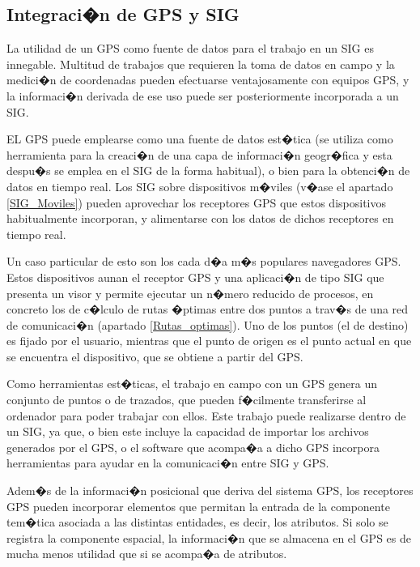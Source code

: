 \subsection{Integraci�n de GPS y SIG}


La utilidad de un GPS como fuente de datos para el trabajo en un SIG es innegable. Multitud de trabajos que requieren la toma de datos en campo y la medici�n de coordenadas pueden efectuarse ventajosamente con equipos GPS, y la informaci�n derivada de ese uso puede ser posteriormente incorporada a un SIG.

EL GPS puede emplearse como una fuente de datos est�tica (se utiliza como herramienta para la creaci�n de una capa de informaci�n geogr�fica y esta despu�s se emplea en el SIG de la forma habitual), o bien para la obtenci�n de datos en tiempo real. Los SIG sobre dispositivos m�viles (v�ase el apartado \ref{SIG_Moviles}) pueden aprovechar los receptores GPS que estos dispositivos habitualmente incorporan, y alimentarse con los datos de dichos receptores en tiempo real.

Un caso particular de esto son los cada d�a m�s populares navegadores GPS. Estos dispositivos aunan el receptor GPS y una aplicaci�n de tipo SIG que presenta un visor y permite ejecutar un n�mero reducido de procesos, en concreto los de c�lculo de rutas �ptimas entre dos puntos a trav�s de una red de comunicaci�n (apartado \ref{Rutas_optimas}). Uno de los puntos (el de destino) es fijado por el usuario, mientras que el punto de origen es el punto actual en que se encuentra el dispositivo, que se obtiene a partir del GPS.

Como herramientas est�ticas, el trabajo en campo con un GPS genera un conjunto de puntos o de trazados, que pueden f�cilmente transferirse al ordenador para poder trabajar con ellos. Este trabajo puede realizarse dentro de un SIG, ya que, o bien este incluye la capacidad de importar los archivos generados por el GPS, o el software que acompa�a a dicho GPS incorpora herramientas para ayudar en la comunicaci�n entre SIG y GPS.

Adem�s de la informaci�n posicional que deriva del sistema GPS, los receptores GPS pueden incorporar elementos que permitan la entrada de la componente tem�tica asociada a las distintas entidades, es decir, los atributos. Si solo se registra la componente espacial, la informaci�n que se almacena en el GPS es de mucha menos utilidad que si se acompa�a de atributos.

